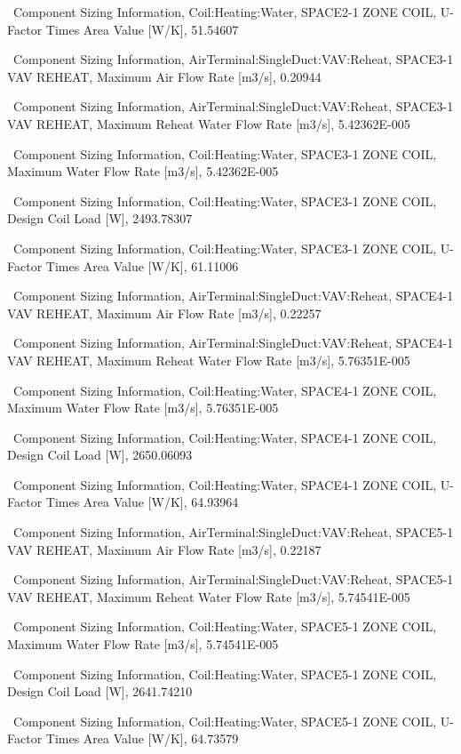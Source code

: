 ~Component Sizing Information, Coil:Heating:Water, SPACE2-1 ZONE COIL, U-Factor Times Area Value {[}W/K{]}, 51.54607

~Component Sizing Information, AirTerminal:SingleDuct:VAV:Reheat, SPACE3-1 VAV REHEAT, Maximum Air Flow Rate {[}m3/s{]}, 0.20944

~Component Sizing Information, AirTerminal:SingleDuct:VAV:Reheat, SPACE3-1 VAV REHEAT, Maximum Reheat Water Flow Rate {[}m3/s{]}, 5.42362E-005

~Component Sizing Information, Coil:Heating:Water, SPACE3-1 ZONE COIL, Maximum Water Flow Rate {[}m3/s{]}, 5.42362E-005

~Component Sizing Information, Coil:Heating:Water, SPACE3-1 ZONE COIL, Design Coil Load {[}W{]}, 2493.78307

~Component Sizing Information, Coil:Heating:Water, SPACE3-1 ZONE COIL, U-Factor Times Area Value {[}W/K{]}, 61.11006

~Component Sizing Information, AirTerminal:SingleDuct:VAV:Reheat, SPACE4-1 VAV REHEAT, Maximum Air Flow Rate {[}m3/s{]}, 0.22257

~Component Sizing Information, AirTerminal:SingleDuct:VAV:Reheat, SPACE4-1 VAV REHEAT, Maximum Reheat Water Flow Rate {[}m3/s{]}, 5.76351E-005

~Component Sizing Information, Coil:Heating:Water, SPACE4-1 ZONE COIL, Maximum Water Flow Rate {[}m3/s{]}, 5.76351E-005

~Component Sizing Information, Coil:Heating:Water, SPACE4-1 ZONE COIL, Design Coil Load {[}W{]}, 2650.06093

~Component Sizing Information, Coil:Heating:Water, SPACE4-1 ZONE COIL, U-Factor Times Area Value {[}W/K{]}, 64.93964

~Component Sizing Information, AirTerminal:SingleDuct:VAV:Reheat, SPACE5-1 VAV REHEAT, Maximum Air Flow Rate {[}m3/s{]}, 0.22187

~Component Sizing Information, AirTerminal:SingleDuct:VAV:Reheat, SPACE5-1 VAV REHEAT, Maximum Reheat Water Flow Rate {[}m3/s{]}, 5.74541E-005

~Component Sizing Information, Coil:Heating:Water, SPACE5-1 ZONE COIL, Maximum Water Flow Rate {[}m3/s{]}, 5.74541E-005

~Component Sizing Information, Coil:Heating:Water, SPACE5-1 ZONE COIL, Design Coil Load {[}W{]}, 2641.74210

~Component Sizing Information, Coil:Heating:Water, SPACE5-1 ZONE COIL, U-Factor Times Area Value {[}W/K{]}, 64.73579

